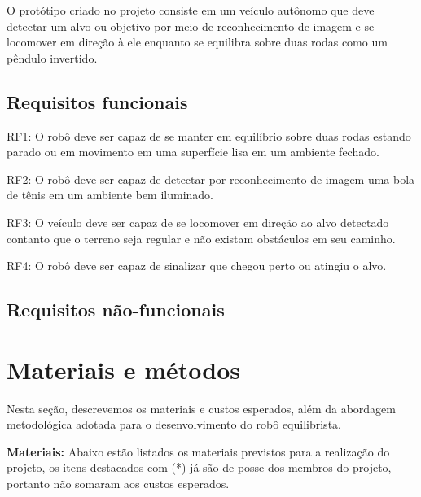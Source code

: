 O protótipo criado no projeto consiste em um veículo autônomo que deve detectar um alvo ou objetivo por meio de reconhecimento de imagem e se locomover em direção à ele enquanto se equilibra sobre duas rodas como um pêndulo invertido. 

\subsection{Requisitos funcionais}

RF1: O robô deve ser capaz de se manter em equilíbrio sobre duas rodas estando parado ou em movimento em uma superfície lisa em um ambiente fechado.

RF2: O robô deve ser capaz de detectar por reconhecimento de imagem uma bola de tênis em um ambiente bem iluminado.

RF3: O veículo deve ser capaz de se locomover em direção ao alvo detectado contanto que o terreno seja regular e não existam obstáculos em seu caminho.

RF4: O robô deve ser capaz de sinalizar que chegou perto ou atingiu o alvo.


\subsection{Requisitos não-funcionais}


\section{\textbf{Materiais e métodos}}
Nesta seção, descrevemos os materiais e custos esperados, além da abordagem metodológica adotada para o desenvolvimento do robô equilibrista.

\textbf{Materiais:} Abaixo estão listados os materiais previstos para a realização do projeto, os itens destacados com (*) já são de posse dos membros do projeto, portanto não somaram aos custos esperados. 

